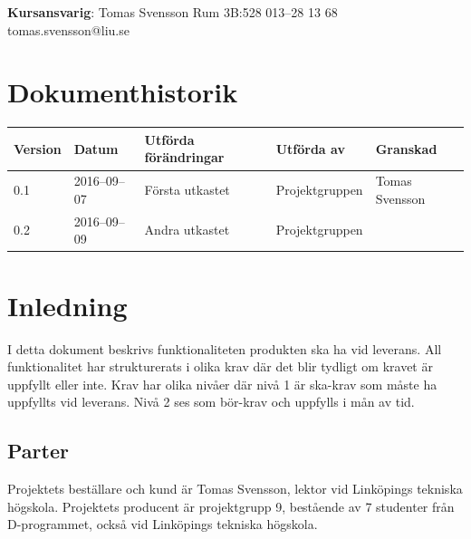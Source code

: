 \documentclass[a4paper,titlepage,12pt]{article}
\begin{document}
\begin{center}
		\centering
		\textbf{Kursansvarig}: Tomas Svensson Rum 3B:528 013--28 13 68 tomas.svensson@liu.se

		\newpage
		\tableofcontents
		
		\newpage

		
		\newpage



		\section*{Dokumenthistorik}
		\begin{table}[h]
			\begin{tabular}[pos]{ l l l l l }
				\textbf{Version} & \textbf{Datum} & \textbf{Utförda förändringar} 
				& \textbf{Utförda av} & \textbf{Granskad} \\ \midrule

				0.1 & 2016--09--07 & Första utkastet & Projektgruppen & Tomas Svensson \\ \midrule
				0.2  & 2016--09--09 & Andra utkastet & Projektgruppen & \\

			\end{tabular}
		\end{table}

	\end{center}


	\newpage

	\section{Inledning}
	I detta dokument beskrivs funktionaliteten produkten ska ha vid leverans. All funktionalitet har strukturerats i olika krav där det 
	blir tydligt om kravet är uppfyllt eller inte. Krav har olika nivåer där
	nivå 1 är ska-krav som måste ha uppfyllts vid leverans. Nivå 2 ses som bör-krav 
	och uppfylls i mån av tid.

	\subsection{Parter}
	Projektets beställare och kund är Tomas Svensson, lektor vid Linköpings tekniska högskola.
	Projektets producent är projektgrupp 9, bestående av 7 studenter från D-programmet, också vid 
	Linköpings tekniska högskola.
\end{document}
